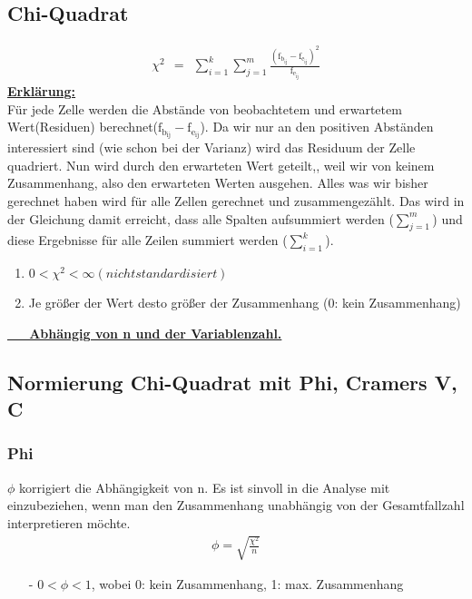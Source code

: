 \subsection{Chi-Quadrat}
\begin{align*}
\chi^{2}~~=~~\sum_{i=1}^{k} \sum_{j=1}^{m} \frac{(\textrm{f}_{\textrm{b}_{\textrm{ij}}} - \textrm{f}_{\textrm{e}_{\textrm{ij}}})^2}
{\textrm{f}_{\textrm{e}_{\textrm{ij}}}}
\end{align*}
\underline{\textbf{Erklärung:}}\\
Für jede Zelle werden die Abstände von beobachtetem und erwartetem Wert(Residuen) berechnet($\textrm{f}_{\textrm{b}_{\textrm{ij}}} - \textrm{f}_{\textrm{e}_{\textrm{ij}}}$). Da wir nur an den positiven Abständen interessiert sind (wie schon bei der Varianz) wird das Residuum der Zelle quadriert. Nun wird durch den erwarteten Wert geteilt,, weil wir von keinem Zusammenhang, also den erwarteten Werten ausgehen. Alles was wir bisher gerechnet haben wird für alle Zellen gerechnet und zusammengezählt. Das wird in der Gleichung damit erreicht, dass alle Spalten aufsummiert werden ($\sum_{j=1}^{m}$) und diese Ergebnisse für alle Zeilen summiert werden ($\sum_{i=1}^{k}$).
\\
\begin{enumerate}
  \item $0 < \chi^2 < \infty (nicht standardisiert)$
  \item Je größer der Wert desto größer der Zusammenhang (0: kein Zusammenhang)
\end{enumerate}
\vspace{0.5cm}
\underline{\textbf{~~~Abhängig von n und der Variablenzahl.}}


\subsection{Normierung Chi-Quadrat mit Phi, Cramers V, C}

\subsubsection{Phi}
$\phi$ korrigiert die Abhängigkeit von n. Es ist sinvoll in die Analyse mit einzubeziehen, wenn man den Zusammenhang unabhängig von der Gesamtfallzahl interpretieren möchte.
\begin{align*}
  \phi =  \sqrt{\frac{\chi^2}{n}}
\end{align*}
\begin{itemize}
  \item [-] $0 < \phi < 1$, wobei 0: kein Zusammenhang, 1: max. Zusammenhang
\end{itemize}

